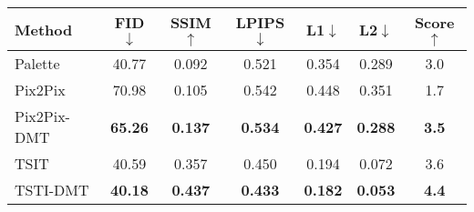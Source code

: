 \begin{table}[ht]
\small
\renewcommand\arraystretch{1}
\centering
\label{tab:compare2}
\vspace{-8pt}
\begin{tabular}{l|cccccc}
Method & \textbf{FID$\downarrow$} & \textbf{SSIM$\uparrow$} & \textbf{LPIPS$\downarrow$} & \textbf{L1$\downarrow$} & \textbf{L2$\downarrow$} & \textbf{Score$\uparrow$} \\
\hline
Palette     & 40.77 & 0.092 & 0.521  & 0.354  & 0.289 & 3.0  \\
\hline
Pix2Pix     & 70.98 & 0.105 & 0.542  & 0.448  & 0.351 & 1.7  \\
Pix2Pix-DMT & \bf 65.26 & \bf 0.137 & \bf 0.534  & \bf 0.427  & \bf 0.288 & \bf 3.5  \\
\hline
TSIT        & 40.59 & 0.357 & 0.450  & 0.194  & 0.072 & 3.6  \\
TSTI-DMT    & \bf 40.18 & \bf 0.437 & \bf 0.433  & \bf 0.182  & \bf 0.053 & \bf 4.4  \\
\end{tabular}
\vspace{-12pt}
\end{table}

